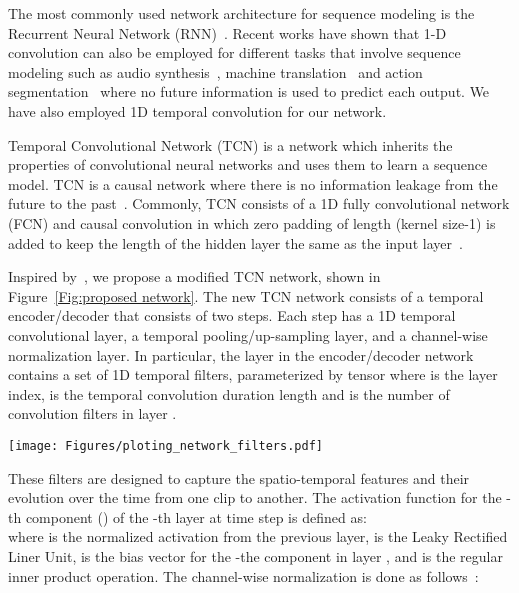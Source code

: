 \documentclass[journal]{IEEEtran}
\begin{document}
The most commonly used network architecture for sequence modeling is the Recurrent Neural Network (RNN)~\cite{goodfellow2016deep}. Recent works have shown that 1-D convolution can also be employed for different tasks that involve sequence modeling such as audio synthesis~\cite{oord2016wavenet}, machine translation~\cite{dauphin2017language} and action segmentation~\cite{lea2017temporal} where no future information is used to predict each output. We have also employed 1D temporal convolution for our network.

Temporal Convolutional Network (TCN) is a network which inherits the properties of convolutional neural networks and uses them to learn a sequence model. TCN is a causal network where there is no information leakage from the future to the past~\cite{bai2018empirical}. Commonly, TCN consists of a 1D fully convolutional network (FCN) and causal convolution in which zero padding of length (kernel size-1) is added to keep the length of the hidden layer the same as the input layer~\cite{bai2018empirical}. 

Inspired by~\cite{lea2017temporal}, we propose a modified TCN network, shown in Figure~\ref{Fig:proposed network}. The new TCN network consists of a temporal encoder/decoder that consists of two steps. Each step has a 1D temporal convolutional layer, a temporal pooling/up-sampling layer, and a channel-wise normalization layer. In particular, the layer  in the encoder/decoder network contains a set of 1D temporal filters, parameterized by tensor  where  is the layer index,  is the temporal convolution duration length and  is the number of convolution filters in layer .
\begin{figure*}
\centering
	\texttt{[image: Figures/ploting\_network\_filters.pdf]}
	\caption{The proposed network, temporal encoding-decoding network.  is the number of convolution filters at layer  used in our network. The script  represents the number of instances in temporal domain. The temporal convolution duration length  is set to 4 in our network.}
	\label{Fig:proposed network}
\end{figure*}
These filters are designed to capture the spatio-temporal features and their evolution over the time from one clip to another. The activation function  for the -th component () of the -th layer at time step  is defined as:\\

where  is the normalized activation from the previous layer,  is the Leaky Rectified Liner Unit,  is the bias vector for the -the component in layer , and  is the regular inner product operation. The channel-wise normalization is done as follows~\cite{lea2017temporal}:\\
\end{document}
